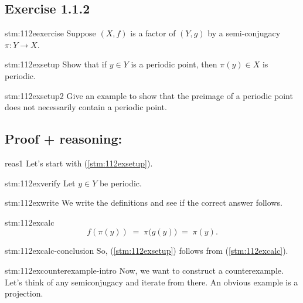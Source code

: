 \subsection*{Exercise 1.1.2}

\begin{exercise}{stm:112eexercise}
Suppose $(X,f)$ is a factor of $(Y,g)$ by a semi-conjugacy $\pi\colon Y \to X$.
\end{exercise}

\begin{exercise}{stm:112exsetup}
Show that if $y \in Y$ is a periodic point, then $\pi(y) \in X$ is periodic.
\end{exercise}

\begin{exercise}{stm:112exsetup2}
Give an example to show that the preimage of a periodic point does not necessarily contain a periodic point.
\end{exercise}

\subsection*{Proof {\color{blue} + reasoning}:}

\begin{explanation}{reas1}
Let's start with (\ref{stm:112exsetup}).
\end{explanation}

\begin{statement}{stm:112exverify}
Let $y \in Y$ be periodic.
\end{statement}

\begin{explanation}{stm:112exwrite}
We write the definitions and see if the correct answer follows.
\end{explanation}

\begin{statement}{stm:112excalc}
$$
f(\pi(y)) \;=\; \pi\bigl(g(y)\bigr) \;=\; \pi(y).
$$
\end{statement}

\begin{statement}{stm:112excalc-conclusion}
So, (\ref{stm:112exsetup}) follows from (\ref{stm:112excalc}).
\end{statement}

\begin{explanation}{stm:112excounterexample-intro}
Now, we want to construct a counterexample. Let's think of any semiconjugacy and iterate from there. An obvious example is a projection.
\end{explanation}

